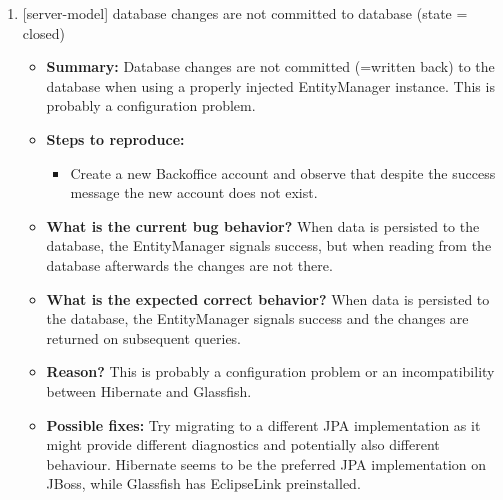 \begin{enumerate}
\item {[server-model] database changes are not committed to database (state = closed)}
\begin{itemize}	
	\item \textbf{Summary: }Database changes are not committed (=written back) to the database when using a properly injected EntityManager instance. This is probably a configuration problem.\\
	\item \textbf{Steps to reproduce: }
	\begin{itemize}
		\item Create a new Backoffice account and observe that despite the success message the new account does not exist.\\
	\end{itemize}
	\item \textbf{What is the current bug behavior? }When data is persisted to the database, the EntityManager signals success, but when reading from the database afterwards the changes are not there.\\
	\item \textbf{What is the expected correct behavior? }When data is persisted to the database, the EntityManager signals success and the changes are returned on subsequent queries.\\
	\item \textbf{Reason? }This is probably a configuration problem or an incompatibility between Hibernate and Glassfish.\\
	\item \textbf{Possible fixes: }Try migrating to a different JPA implementation as it might provide different diagnostics and potentially also different behaviour. Hibernate seems to be the preferred JPA implementation on JBoss, while Glassfish has EclipseLink preinstalled.\\
\end{itemize}

\end{enumerate}